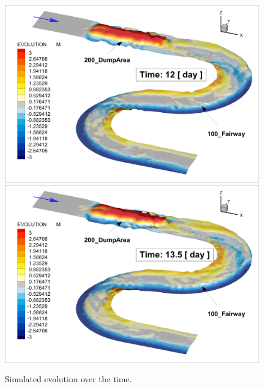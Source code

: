 \begin{figure} [!h]
\centering
\includegraphics[scale=0.14]{critDig_Poly_12p0d.png}
\includegraphics[scale=0.14]{critDig_Poly_13p5d.png}
\caption{Simulated evolution over the time.}\label{result78}
\end{figure}
